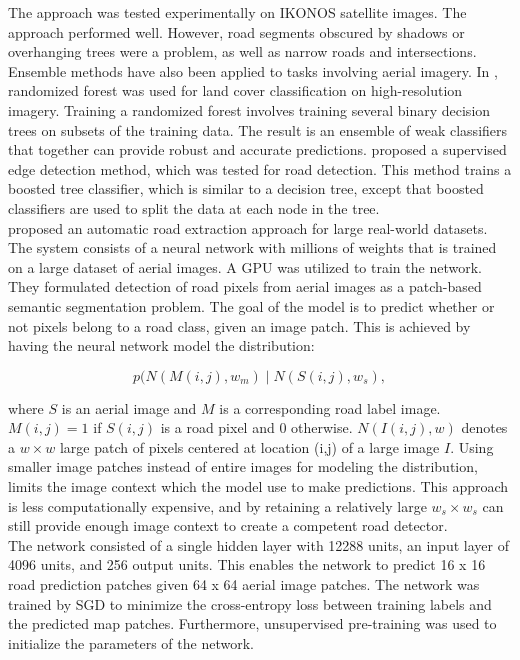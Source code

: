 The approach was tested experimentally on IKONOS satellite images. The approach performed well. However, road segments obscured by shadows or overhanging trees were a problem, as well as narrow roads and intersections.\\

Ensemble methods have also been applied to tasks involving aerial imagery. In \citep{Kluckner_semantic_height}, randomized forest was used for land cover classification on high-resolution imagery. Training a randomized forest involves training several binary decision trees on subsets of the training data. The result is an ensemble of weak classifiers that together can provide robust and accurate predictions. \cite{Dollar_supervised_edge} proposed a supervised edge detection method, which was tested for road detection. This method trains a boosted tree classifier, which is similar to a decision tree, except that boosted classifiers are used to split the data at each node in the tree.\\

\cite{Mnih_roads_high_res_aerial_images} proposed an automatic road extraction approach for large real-world datasets. The system consists of a neural network with millions of weights that is trained on a large dataset of aerial images. A \ac{GPU} was utilized to train the network.  \\

They formulated detection of road pixels from aerial images as a patch-based semantic segmentation problem. 
The goal of the model is to predict whether or not pixels belong to a road class, given an image patch. This is achieved by having the neural network model the distribution:

 $$p(N(M(i,j), w_m) \mid N(S(i,j), w_s),$$ 
 
\noindent where $S$ is an aerial image and $M$ is a corresponding road label image. $M(i,j) = 1$ if $S(i,j)$ is a road pixel and 0 otherwise.  $N(I(i,j), w)$  denotes a $w \times w$ large patch of pixels centered at location (i,j) of a large image $I$. Using smaller image patches instead of entire images for modeling the distribution, limits the image context which the model use to make predictions. This approach is less computationally expensive, and by retaining a relatively large $w_s \times w_s$ can still provide enough image context to create a competent road detector. \\

The network consisted of a single hidden layer with 12288 units, an input layer of 4096 units, and 256 output units. This enables the network to predict 16 x 16 road prediction patches given 64 x 64 aerial image patches. The network was trained by \ac{SGD} to minimize the cross-entropy loss between training labels and the predicted map patches. Furthermore, unsupervised pre-training was used to initialize the parameters of the network.\\

